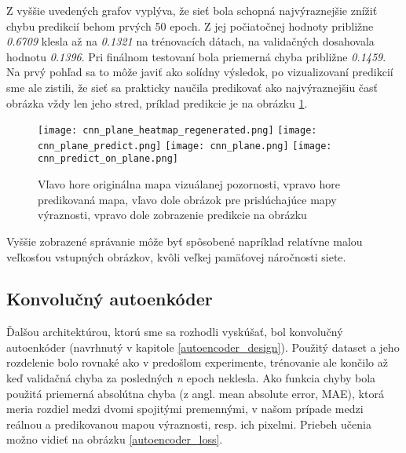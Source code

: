 Z vyššie uvedených grafov vyplýva, že sieť bola schopná najvýraznejšie znížiť chybu predikcií behom prvých 50 epoch. Z jej počiatočnej hodnoty približne \textit{0.6709} klesla až na \textit{0.1321} na trénovacích dátach, na validačných dosahovala hodnotu \textit{0.1396}. Pri finálnom testovaní bola priemerná chyba približne \textit{0.1459}. Na prvý pohľad sa to môže javiť ako solídny výsledok, po vizualizovaní predikcií sme ale zistili, že sieť sa prakticky naučila predikovať ako najvýraznejšiu časť obrázka vždy len jeho stred, príklad predikcie je na obrázku \ref{cnn_results}.

\begin{figure}[H]
	\begin{center}
		
		\texttt{[image: cnn\_plane\_heatmap\_regenerated.png]}
		\texttt{[image: cnn\_plane\_predict.png]}
		\texttt{[image: cnn\_plane.png]}
		\texttt{[image: cnn\_predict\_on\_plane.png]}
		\caption[Vzorka predikcie konvolučnej neurónovej siete]{
			Vľavo hore originálna mapa vizuálanej pozornosti, vpravo hore predikovaná mapa, vľavo dole obrázok pre prislúchajúce mapy výraznosti, vpravo dole zobrazenie predikcie na obrázku
		}\label{cnn_results}
	\end{center}
\end{figure}

Vyššie zobrazené správanie môže byť spôsobené napríklad relatívne malou veľkosťou vstupných obrázkov, kvôli veľkej pamäťovej náročnosti siete. 

\subsection{Konvolučný autoenkóder}
\label{experiments_autoencoder}

Ďalšou architektúrou, ktorú sme sa rozhodli vyskúšať, bol konvolučný autoenkóder (navrhnutý v kapitole \ref{autoencoder_design}). Použitý dataset a jeho rozdelenie bolo rovnaké ako v predošlom experimente, trénovanie ale končilo až keď validačná chyba za posledných \textit{n} epoch neklesla. Ako funkcia chyby bola použitá priemerná absolútna chyba (z angl. mean absolute error, MAE), ktorá meria rozdiel medzi dvomi spojitými premennými, v našom prípade medzi reálnou a predikovanou mapou výraznosti, resp. ich pixelmi. Priebeh učenia možno vidieť na obrázku \ref{autoencoder_loss}. 

